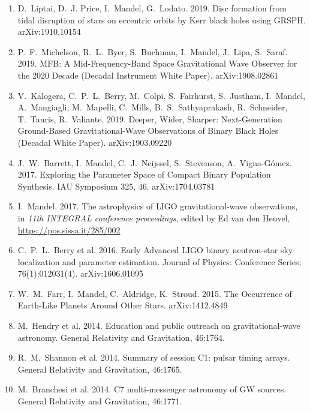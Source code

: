 \documentclass[margin,line]{res}
\begin{document}
\begin{resume}
\begin{enumerate}
\item D.~Liptai, D.~J. Price, I.~Mandel, G.~Lodato.  2019.  Disc formation from tidal disruption of stars on eccentric orbits by Kerr black holes using GRSPH.  arXiv:1910.10154

\item P.~F.~Michelson, R.~L.~Byer, S.~Buchman, I.~Mandel, J.~Lipa, S.~Saraf.  2019. MFB: A Mid-Frequency-Band Space Gravitational Wave Observer for the 2020 Decade (Decadal Instrument White Paper). arXiv:1908.02861 

\item V.~Kalogera, C.~P.~L.~Berry, M.~Colpi, S.~Fairhurst, S.~Justham, I.~Mandel, A.~Mangiagli, M.~Mapelli, C.~Mills, B.~S.~Sathyaprakash, R.~Schneider, T.~Tauris, R.~Valiante. 2019.  Deeper, Wider, Sharper: Next-Generation Ground-Based Gravitational-Wave Observations of Binary Black Holes (Decadal White Paper).  arXiv:1903.09220 

\item J.~W.~Barrett, I.~Mandel, C.~J.~Neijssel, S.~Stevenson, A.~Vigna-G\'{o}mez. 2017. Exploring the Parameter Space of Compact Binary Population Synthesis. IAU Symposium 325, 46. arXiv:1704.03781 

\item I.~Mandel.  2017. The astrophysics of LIGO gravitational-wave observations, in {\it 11th INTEGRAL conference proceedings}, edited by Ed van den Heuvel, \url{https://pos.sissa.it/285/002}

\item C.~P.~L.~Berry et al.  2016.  Early Advanced LIGO binary neutron-star sky localization and parameter estimation.  Journal of Physics: Conference Series; 76(1):012031(4).  arXiv:1606.01095

\item W.~M.~Farr, I.~Mandel, C.~Aldridge, K.~Stroud. 2015. The Occurrence of Earth-Like Planets Around Other Stars.  arXiv:1412.4849
  
\item M.~Hendry et al. 2014. Education and public outreach on gravitational-wave astronomy.  General Relativity and Gravitation, 46:1764.

\item R.~M.~Shannon et al. 2014. Summary of session C1: pulsar timing arrays. General Relativity and Gravitation, 46:1765.

\item M.~Branchesi et al. 2014.  C7 multi-messenger astronomy of GW sources.
General Relativity and Gravitation, 46:1771.


\end{enumerate}
\end{resume}
\end{document}
